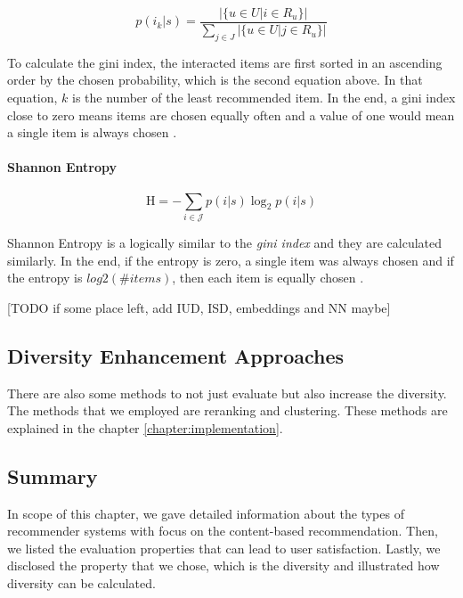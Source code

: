 $$
p ( i_{k} | s ) = \frac { | \{ u \in { U } | i \in R _ { u } \} | } { \sum _ { j \in J } | \{ u \in { U } | j \in R _ { u } \} | }
$$

To calculate the gini index, the interacted items are first sorted in an ascending order by the chosen probability, which is the second equation above. In that equation, $k$ is the number of the least recommended item. In the end, a gini index close to zero means items are chosen equally often and a value of one would mean a single item is always chosen \cite{castells2015novelty}.

\paragraph{Shannon Entropy}

$$
\mathrm { H } = - \sum _ { i \in \mathcal { J } } p ( i | s ) \log _ { 2 } p ( i | s )
$$

Shannon Entropy is a logically similar to the \textit{gini index} and they are calculated similarly. In the end, if the entropy is zero, a single item was always chosen and if the entropy is $log2(\#items)$, then each item is equally chosen \cite{castells2015novelty}.

[TODO if some place left, add IUD, ISD, embeddings and NN maybe]

\subsection{Diversity Enhancement Approaches}

There are also some methods to not just evaluate but also increase the diversity. The methods that we employed are reranking and clustering. These methods are explained in the chapter \ref{chapter:implementation}.

\subsection{Summary}


In scope of this chapter, we gave detailed information about the types of recommender systems with focus on the content-based recommendation. Then, we listed the evaluation properties that can lead to user satisfaction. Lastly, we disclosed the property that we chose, which is the diversity and illustrated how diversity can be calculated.
